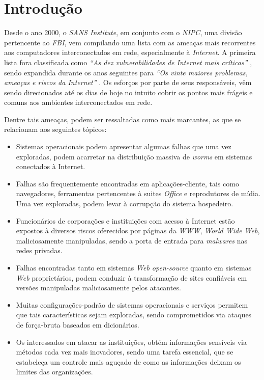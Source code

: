 \chapter*{Introdução}

Desde o ano 2000, o \textit{SANS Institute}, em conjunto com o \textit{NIPC}, uma divisão pertencente ao \textit{FBI}, vem compilando uma lista com as ameaças mais recorrentes aos computadores interconectados em rede, especialmente à \textit{Internet}. A primeira lista fora classificada como \textit{``As dez vulnerabilidades de Internet mais críticas''} \cite{Top10Sans}, sendo expandida durante os anos seguintes para \textit{``Os vinte maiores problemas, ameaças e riscos da Internet''} \cite{Top20Sans}. Os esforços por parte de seus responsáveis, vêm sendo direcionados até os dias de hoje no intuito cobrir os pontos mais frágeis e comuns aos ambientes interconectados em rede.

Dentre tais ameaças, podem ser ressaltadas como mais marcantes, as que se relacionam aos seguintes tópicos:

\begin{itemize}
    \item Sistemas operacionais podem apresentar algumas falhas que uma vez exploradas, podem acarretar na distribuição massiva de \textit{worms} em sistemas conectados à Internet.
    \item Falhas são frequentemente encontradas em aplicações-cliente, tais como navegadores, ferramentas pertencentes à suites \textit{Office} e reprodutores de mídia. Uma vez exploradas, podem levar à corrupção do sistema hospedeiro.
    \item Funcionários de corporações e instituições com acesso à Internet estão expostos à diversos riscos oferecidos por páginas da \textit{WWW}, \textit{World Wide Web},  maliciosamente manipuladas, sendo a porta de entrada para \textit{malwares} nas redes privadas.
    \item Falhas encontradas tanto em sistemas \textit{Web open-source} quanto em sistemas \textit{Web} proprietários, podem conduzir à transformação de sites confiáveis em versões manipuladas maliciosamente pelos atacantes.
    \item Muitas configurações-padrão de sistemas operacionais e serviços permitem que tais características sejam exploradas, sendo comprometidos via ataques de força-bruta baseados em dicionários.
    \item Os interessados em atacar as instituições, obtém informações sensíveis via métodos cada vez mais inovadores, sendo uma tarefa essencial, que se estabeleça um controle mais aguçado de como as informações deixam os limites das organizações.
\end{itemize}

